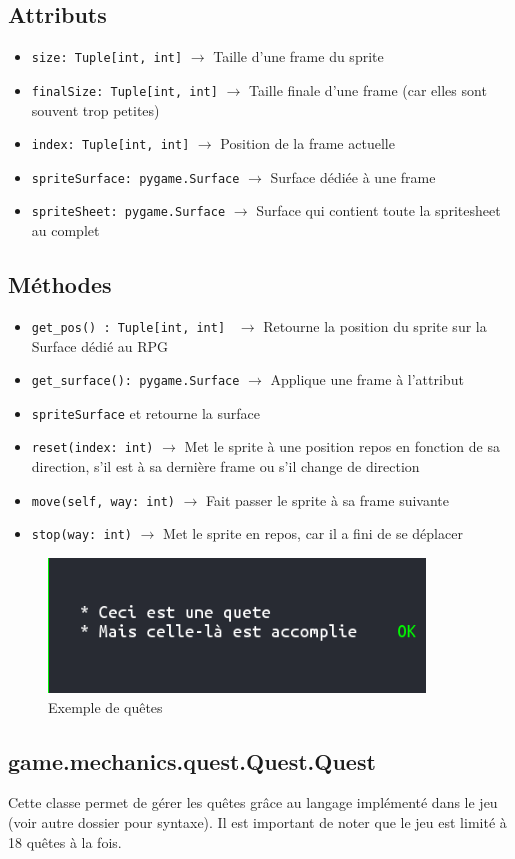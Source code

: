 \documentclass{report}
\begin{document}
\subsection*{Attributs}
\begin{itemize}
  \item \texttt{size: Tuple[int, int]}		$\rightarrow$ Taille d’une frame du sprite
  \item \texttt{finalSize: Tuple[int, int]}		$\rightarrow$ Taille finale d’une frame (car elles sont souvent trop petites)
  \item \texttt{index: Tuple[int, int]}		$\rightarrow$ Position de la frame actuelle
  \item \texttt{spriteSurface: pygame.Surface}		$\rightarrow$ Surface dédiée à une frame
  \item \texttt{spriteSheet: pygame.Surface}		$\rightarrow$ Surface qui contient toute la spritesheet au complet
  \end{itemize}
\subsection*{Méthodes}
\begin{itemize}
  \item \texttt{get_pos() : Tuple[int, int] }		$\rightarrow$ Retourne la position du sprite sur la Surface dédié au RPG
  \item \texttt{get_surface(): pygame.Surface}		$\rightarrow$ Applique une frame à l’attribut \item \texttt{spriteSurface} et retourne la surface
  \item \texttt{reset(index: int)}		$\rightarrow$ Met le sprite à une position repos en fonction de sa direction, s’il est à sa dernière frame ou s’il change de direction
  \item \texttt{move(self, way: int)}		$\rightarrow$ Fait passer le sprite à sa frame suivante
  \item \texttt{stop(way: int)}		$\rightarrow$ Met le sprite en repos, car il a fini de se déplacer
\end{itemize}
\newpage
\begin{figure}[hb!]
  \centering
  \includegraphics[width=10cm]{img/image4}
  \caption{Exemple de quêtes}
  \label{fig:spritesheet}
\end{figure}
\subsection{game.mechanics.quest.Quest.Quest}
Cette classe permet de gérer les quêtes grâce au langage implémenté dans le jeu (voir autre dossier pour syntaxe). Il est important de noter que le jeu est limité à 18 quêtes à la fois.
\end{document}
